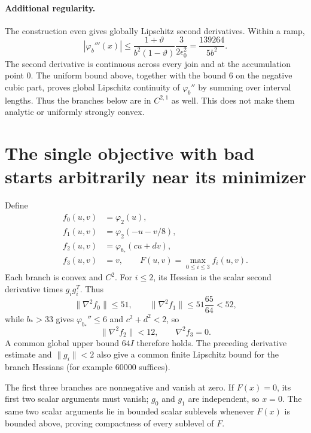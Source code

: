 \documentclass[10pt,oneside,openany]{book}
\theoremstyle{remark}\newtheorem{remark}{Remark}[chapter]
\begin{document}
\paragraph{Additional regularity.}
The construction even gives globally Lipschitz second derivatives. Within a ramp,
\[
 |\varphi_b'''(x)|
 \le\frac{1+\vartheta}{b^2(1-\vartheta)}
       \frac{3}{2\epsilon_0^2}
 =\frac{139264}{5b^2}.
\]
The second derivative is continuous across every join and at the accumulation point $0$. The uniform bound above, together with the bound $6$ on the negative cubic part, proves global Lipschitz continuity of $\varphi_b''$ by summing over interval lengths. Thus the branches below are in $C^{2,1}$ as well. This does not make them analytic or uniformly strongly convex.


\setcounter{section}{4}
\setcounter{theorem}{1}
\setcounter{lemma}{2}
\setcounter{corollary}{0}
\setcounter{proposition}{0}
\setcounter{remark}{0}
\setcounter{equation}{8}
\section{The single objective with bad starts arbitrarily near its minimizer}
Define
\begin{equation}\label{D:fullobjective}
\begin{split}
 f_0(u,v)&=\varphi_2(u),\\
 f_1(u,v)&=\varphi_2(-u-v/8),\\
 f_2(u,v)&=\varphi_{b_*}(cu+dv),\\
 f_3(u,v)&=v,\qquad F(u,v)=\max_{0\le i\le3}f_i(u,v).
\end{split}
\end{equation}
Each branch is convex and $C^2$. For $i\le2$, its Hessian is the scalar second derivative times $g_i g_i^T$. Thus
\[
 \|\nabla^2f_0\|\le51,\qquad
 \|\nabla^2f_1\|\le51\frac{65}{64}<52,
\]
while $b_*>33$ gives $\varphi_{b_*}''\le6$ and $c^2+d^2<2$, so
\[
 \|\nabla^2f_2\|<12,\qquad\nabla^2f_3=0.
\]
A common global upper bound $64I$ therefore holds. The preceding derivative estimate and $\|g_i\|<2$ also give a common finite Lipschitz bound for the branch Hessians (for example $60000$ suffices).

The first three branches are nonnegative and vanish at zero. If $F(x)=0$, its first two scalar arguments must vanish; $g_0$ and $g_1$ are independent, so $x=0$. The same two scalar arguments lie in bounded scalar sublevels whenever $F(x)$ is bounded above, proving compactness of every sublevel of $F$.
\end{document}
